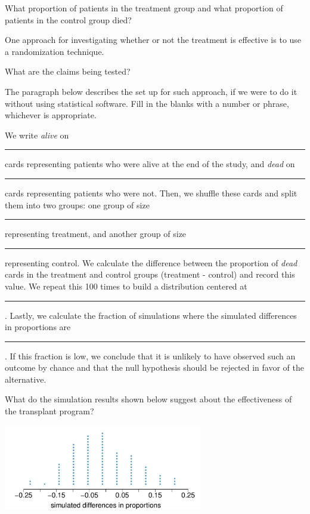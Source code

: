 {\begin{parts}
\item What proportion of patients in the treatment group and what proportion of 
patients in the control group died?
\item One approach for investigating whether or not the treatment is effective 
is to use a randomization technique.
\begin{subparts}
\item What are the claims being tested?
\item The paragraph below describes the set up for such approach, if we were 
to do it without using statistical software. Fill in the blanks with a number 
or phrase, whichever is appropriate.
\begin{adjustwidth}{2em}{2em}
We write \textit{alive} on \rule{2cm}{0.5pt} cards representing patients who were 
alive at the end of the study, and \textit{dead} on \rule{2cm}{0.5pt} cards 
representing patients who were not. Then, we shuffle these cards and split them 
into two groups: one group of size \rule{2cm}{0.5pt} representing treatment, and 
another group of size \rule{2cm}{0.5pt} representing control. We calculate the 
difference between the proportion of \textit{dead} cards in the treatment and 
control groups (treatment - control) and record this value. We repeat this 100 
times to build a distribution centered at \rule{2cm}{0.5pt}. Lastly, we calculate 
the fraction of simulations where the simulated differences in proportions are 
\rule{2cm}{0.5pt}. If this fraction is low, we conclude that it is unlikely to 
have observed such an outcome by chance and that the null hypothesis should 
be rejected in favor of the alternative.
\end{adjustwidth}
\item What do the simulation results shown below suggest about the effectiveness 
of the transplant program?
\end{subparts}
\end{parts}
\begin{center}
\includegraphics[width= 0.65\textwidth]{ch_intro_to_data/figures/eoce/randomization_heart_transplants/randomization_heart_transplants_rando.pdf}
\end{center}
}{}
